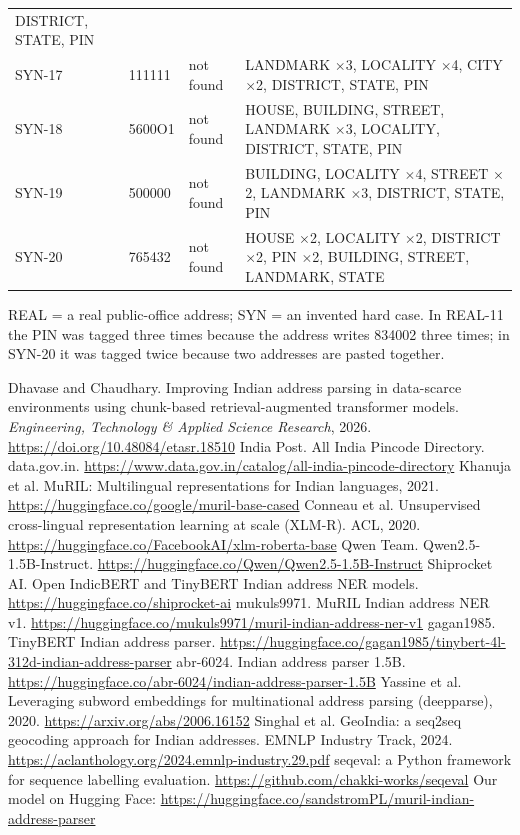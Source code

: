 \documentclass[11pt,a4paper]{article}
\begin{document}
\begin{table}[H]
\begin{tabularx}{\textwidth}{@{}lllL@{}}
DISTRICT, STATE, PIN\\
SYN-17 & 111111 & not found & LANDMARK $\times$3, LOCALITY $\times$4, CITY $\times$2, DISTRICT, STATE, PIN\\
SYN-18 & 5600O1 & not found & HOUSE, BUILDING, STREET, LANDMARK $\times$3, LOCALITY, DISTRICT, STATE, PIN\\
SYN-19 & 500000 & not found & BUILDING, LOCALITY $\times$4, STREET $\times$2, LANDMARK $\times$3, DISTRICT, STATE,
PIN\\
SYN-20 & 765432 & not found & HOUSE $\times$2, LOCALITY $\times$2, DISTRICT $\times$2, PIN $\times$2, BUILDING,
STREET, LANDMARK, STATE\\
\bottomrule
\end{tabularx}
\end{table}
REAL = a real public-office address; SYN = an invented hard case. In REAL-11 the PIN was tagged three times because
the address writes 834002 three times; in SYN-20 it was tagged twice because two addresses are pasted together.

\begin{thebibliography}{99}
\raggedright
{} Dhavase and Chaudhary. Improving Indian address parsing in data-scarce environments using chunk-based
retrieval-augmented transformer models. \emph{Engineering, Technology \& Applied Science Research}, 2026.
\url{https://doi.org/10.48084/etasr.18510}
 India Post. All India Pincode Directory. data.gov.in.
\url{https://www.data.gov.in/catalog/all-india-pincode-directory}
 Khanuja et al. MuRIL: Multilingual representations for Indian languages, 2021.
\url{https://huggingface.co/google/muril-base-cased}
 Conneau et al. Unsupervised cross-lingual representation learning at scale (\mbox{XLM-R}). ACL, 2020.
\url{https://huggingface.co/FacebookAI/xlm-roberta-base}
 Qwen Team. Qwen2.5-1.5B-Instruct. \url{https://huggingface.co/Qwen/Qwen2.5-1.5B-Instruct}
 Shiprocket AI. Open IndicBERT and TinyBERT Indian address NER models.
\url{https://huggingface.co/shiprocket-ai}
 mukuls9971. MuRIL Indian address NER v1.
\url{https://huggingface.co/mukuls9971/muril-indian-address-ner-v1}
 gagan1985. TinyBERT Indian address parser.
\url{https://huggingface.co/gagan1985/tinybert-4l-312d-indian-address-parser}
 abr-6024. Indian address parser 1.5B. \url{https://huggingface.co/abr-6024/indian-address-parser-1.5B}
 Yassine et al. Leveraging subword embeddings for multinational address parsing (deepparse), 2020.
\url{https://arxiv.org/abs/2006.16152}
 Singhal et al. GeoIndia: a seq2seq geocoding approach for Indian addresses. EMNLP Industry
Track, 2024. \url{https://aclanthology.org/2024.emnlp-industry.29.pdf}
 seqeval: a Python framework for sequence labelling evaluation.
\url{https://github.com/chakki-works/seqeval}
 Our model on Hugging Face: \url{https://huggingface.co/sandstromPL/muril-indian-address-parser}
\end{thebibliography}
\end{document}
